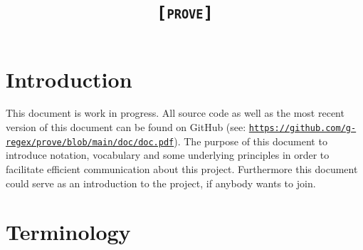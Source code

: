 \documentclass[british]{article}
\title{\texttt{\textsc{{[}prove{]}}}}
\begin{document}
\maketitle

\section{Introduction}

This document is work in progress. All source code as well as the most recent version of this document can be found on GitHub (see: \href{https://github.com/g-regex/prove/blob/main/doc/doc.pdf}{\texttt{https://github.com/g-regex/prove/blob/main/doc/doc.pdf}}). The purpose of this document to introduce
notation, vocabulary and some underlying principles in order to facilitate
efficient communication about this project. Furthermore this document
could serve as an introduction to the project, if anybody wants to
join.

\pagebreak{}

\section{Terminology}
\end{document}
